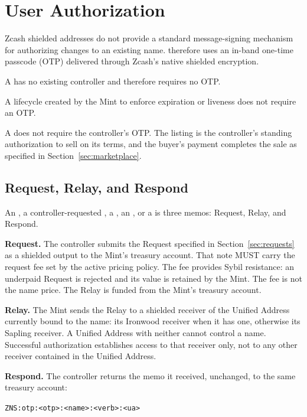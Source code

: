 \section{User Authorization}
\label{sec:authorization}

Zcash shielded addresses do not provide a standard message-signing mechanism for authorizing changes to an existing name. \zns{} therefore uses an in-band one-time passcode (OTP) delivered through Zcash's native shielded encryption.

A  has no existing controller and therefore requires no OTP.

A lifecycle  created by the Mint to enforce expiration or liveness does not require an OTP.

A  does not require the controller's OTP. The listing is the controller's standing authorization to sell on its terms, and the buyer's payment completes the sale as specified in Section~\ref{sec:marketplace}.

\subsection{Request, Relay, and Respond}

An , a controller-requested , a , an , or a  is three memos: Request, Relay, and Respond.

\textbf{Request.} The controller submits the Request specified in Section~\ref{sec:requests} as a shielded output to the Mint's treasury account. That note MUST carry the request fee set by the active pricing policy. The fee provides Sybil resistance: an underpaid Request is rejected and its value is retained by the Mint. The fee is not the name price. The Relay is funded from the Mint's treasury account.

\textbf{Relay.} The Mint sends the Relay to a shielded receiver of the Unified Address currently bound to the name: its Ironwood receiver when it has one, otherwise its Sapling receiver. A Unified Address with neither cannot control a name. Successful authorization establishes access to that receiver only, not to any other receiver contained in the Unified Address.

\textbf{Respond.} The controller returns the memo it received, unchanged, to the same treasury account:

\begin{center}
\texttt{ZNS:otp:<otp>:<name>:<verb>:<ua>}
\end{center}

